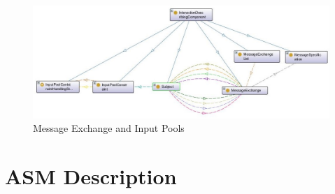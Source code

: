 \begin{figure}[ph]
	\centering
	\includegraphics[width=15cm]{20181026-Ontologie-Bilder/Grafiken-Ontologie/SUbject-Interaction/20181203-Interaction-describing-component.jpg}
	\caption[Message Exchange and Input Pools]{Message Exchange and Input Pools}
	\label{fig:20181203-interaction-describing-component}
\end{figure}


\section{ASM Description}